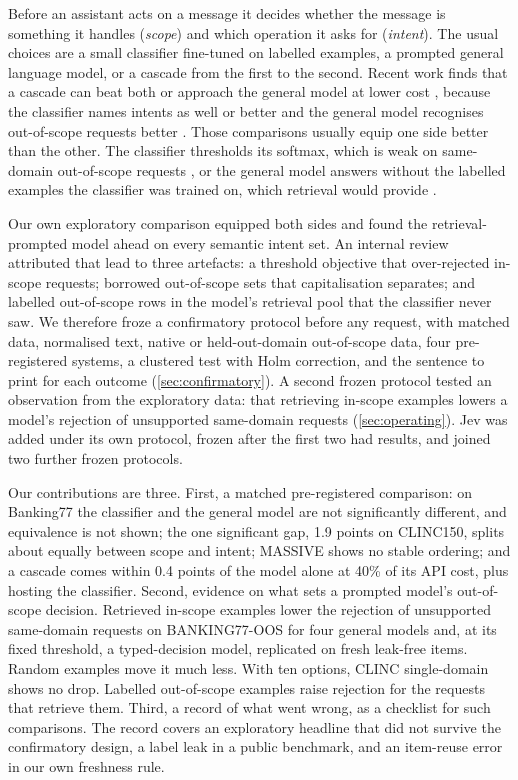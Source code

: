 \documentclass[11pt]{article}
\begin{document}
Before an assistant acts on a message it decides whether the message is something it handles (\emph{scope}) and which operation it asks for (\emph{intent}). The usual choices are a small classifier fine-tuned on labelled examples, a prompted general language model, or a cascade from the first to the second. Recent work finds that a cascade can beat both \citep{chen2025fcslm} or approach the general model at lower cost \citep{zaera2025udril,arora2024intent}, because the classifier names intents as well or better and the general model recognises out-of-scope requests better \citep{rodrigues2026nlu}. Those comparisons usually equip one side better than the other. The classifier thresholds its softmax, which is weak on same-domain out-of-scope requests \citep{zhang2022oos,podolskiy2021mahalanobis}, or the general model answers without the labelled examples the classifier was trained on, which retrieval would provide \citep{milios2023manylabels,loukas2023penny}.

Our own exploratory comparison equipped both sides and found the retrieval-prompted model ahead on every semantic intent set. An internal review attributed that lead to three artefacts:
a threshold objective that over-rejected in-scope requests;
borrowed out-of-scope sets that capitalisation separates;
and labelled out-of-scope rows in the model's retrieval pool that the classifier never saw.
We therefore froze a confirmatory protocol before any request, with matched data, normalised text, native or held-out-domain out-of-scope data, four pre-registered systems, a clustered test with Holm correction, and the sentence to print for each outcome (\cref{sec:confirmatory}). A second frozen protocol tested an observation from the exploratory data: that retrieving in-scope examples lowers a model's rejection of unsupported same-domain requests (\cref{sec:operating}). Jev was added under its own protocol, frozen after the first two had results, and joined two further frozen protocols.

Our contributions are three. First, a matched pre-registered comparison: on Banking77 the classifier and the general model are not significantly different, and equivalence is not shown; the one significant gap, 1.9 points on CLINC150, splits about equally between scope and intent; MASSIVE shows no stable ordering; and a cascade comes within 0.4 points of the model alone at 40\% of its API cost, plus hosting the classifier. Second, evidence on what sets a prompted model's out-of-scope decision. Retrieved in-scope examples lower the rejection of unsupported same-domain requests on BANKING77-OOS for four general models and, at its fixed threshold, a typed-decision model, replicated on fresh leak-free items. Random examples move it much less. With ten options, CLINC single-domain shows no drop. Labelled out-of-scope examples raise rejection for the requests that retrieve them. Third, a record of what went wrong, as a checklist for such comparisons. The record covers an exploratory headline that did not survive the confirmatory design, a label leak in a public benchmark, and an item-reuse error in our own freshness rule.
\end{document}
